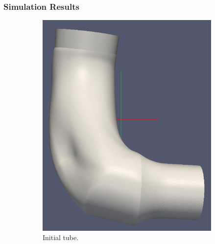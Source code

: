 \documentclass[10pt,xcolor=table,english]{beamer}   %
\begin{document}
\begin{frame}
\frametitle{Simulation Results}
    \begin{figure}
        \begin{subfigure}{.49\textwidth}
            \centering
            \includegraphics[width=.9\linewidth]{tube_iteration_0}  
            \caption{Initial tube.}
            \label{fig:sub-first}
        \end{subfigure}
        \begin{subfigure}{.49\textwidth}
            \centering

\end{subfigure}
\end{figure}
\end{frame}
\end{document}
